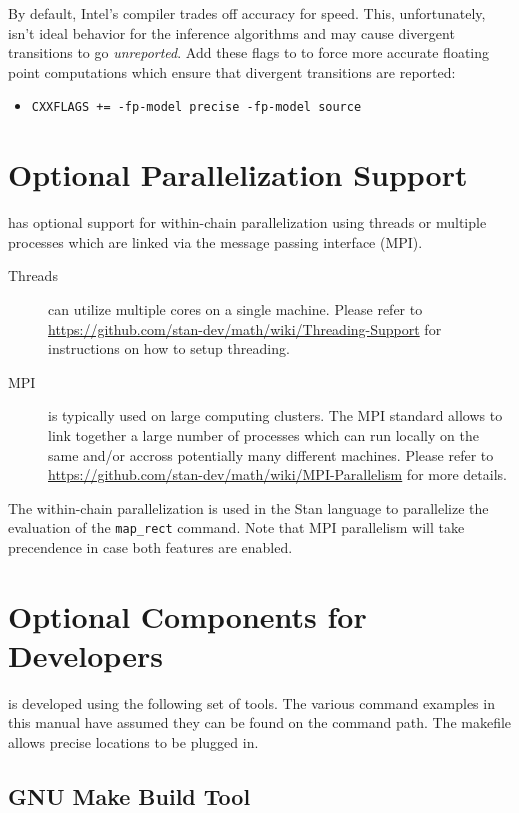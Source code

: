 By default, Intel's compiler trades off accuracy for speed. This,
unfortunately, isn't ideal behavior for the inference algorithms and
may cause divergent transitions to go {\em unreported}. Add these
flags to  to force more accurate floating point
computations which ensure that divergent transitions are reported:
\begin{itemize}
  \item \Verb|CXXFLAGS += -fp-model precise -fp-model source|
\end{itemize}


\section{Optional Parallelization Support}

\CmdStan has optional support for within-chain parallelization using
threads or multiple processes which are linked via the message passing
interface (MPI).
%
\begin{description}
  \item[Threads] can utilize multiple cores on a single
    machine. Please refer to
    \url{https://github.com/stan-dev/math/wiki/Threading-Support} for
    instructions on how to setup threading.
  \item[MPI] is typically used on large computing clusters. The MPI
    standard allows to link together a large number of processes which
    can run locally on the same and/or accross potentially many
    different machines. Please refer to
    \url{https://github.com/stan-dev/math/wiki/MPI-Parallelism} for
    more details.
\end{description}
%
The within-chain parallelization is used in the Stan language to
parallelize the evaluation of the \Verb|map_rect| command. Note that
MPI parallelism will take precendence in case both features are
enabled.

\section{Optional Components for Developers}

\CmdStan is developed using the following set of tools.  The various
command examples in this manual have assumed they can be found on
the command path.  The makefile allows precise locations to be plugged
in.

\subsection{GNU Make Build Tool}

